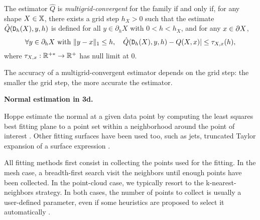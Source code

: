 \begin{Definition}
  \label{def:multigrid-convergence2}
  The estimator $\hat{Q}$ is {\em multigrid-convergent} for the family
  {\Shapes} if and only if, for any shape $X \in \mathbb{X}$,
  there exists a grid step $h_X>0$ such that the estimate
    $\hat{Q}({\mathtt{D}_h}(X),y,h)$ is defined for all
  $y \in \partial_h X$ with $0<h < h_X$, and for any $x \in \partial X$,
  \begin{equation*}
    \forall y \in \partial_h X \text{~with~} \| y - x \|_1 \le h, \quad
    \hat{Q}({\mathtt{D}_h}(X),y,h) - Q(X,x) | \le \tau_{X,x}(h),
  \end{equation*}
  where $\tau_{X,x}: {\mathbb{R}}^{+*} \rightarrow {\ensuremath\mathbb{R}}^+$ has null limit at
  $0$.
\end{Definition}

The accuracy of a multigrid-convergent estimator depends on the grid step:
the smaller the grid step, the more accurate the estimator. 





\noindent\textbf{Normal estimation in 3d.}

Hoppe \etal estimate the normal at a given data point by computing
the least squares best fitting plane to a point set within a neighborhood
around the point of interest \cite{Hoppe1992}.
Other fitting surfaces have been used too, such as jets, \ie truncated Taylor expansion
of a surface expression \cite{Cazals2005,Cazals2008}. 

All fitting methods first consist in collecting the points used for the fitting.
In the mesh case, a breadth-first search visit the neighbors until enough points
have been collected. In the point-cloud case, we typically resort to the k-nearest-neighbors
strategy. In both cases, the number of points to collect is usually a user-defined parameter,
even if some heuristics are proposed to select it automatically \cite{Hoppe1992,Cazals2005}.  

